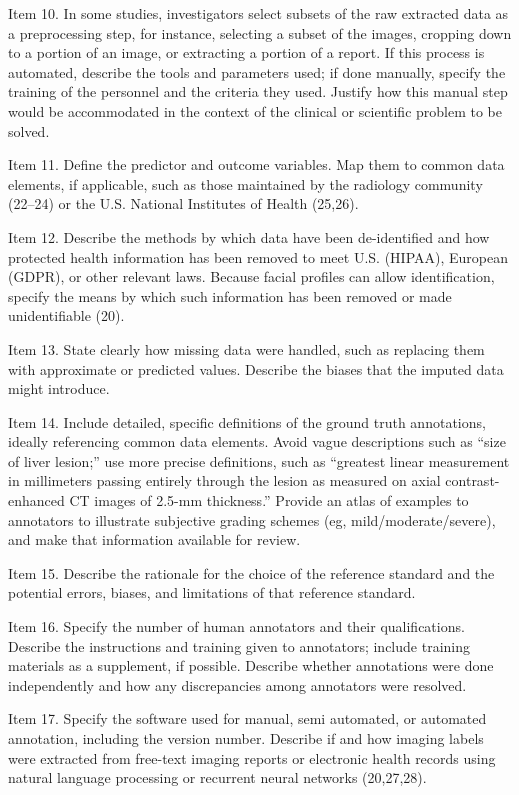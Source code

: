 Item 10. In some studies, investigators select subsets of the raw extracted data as a preprocessing step, for instance, selecting a subset of the images, cropping down to a portion of an image, or extracting a portion of a report. If this process is automated, describe the tools and parameters used; if done manually, specify the training of the personnel and the criteria they used. Justify how this manual step would be accommodated in the context of the clinical or scientific problem to be solved.

Item 11. Define the predictor and outcome variables. Map them to common data elements, if applicable, such as those maintained by the radiology community (22–24) or the U.S. National Institutes of Health (25,26).

Item 12. Describe the methods by which data have been de-identified and how protected health information has been removed to meet U.S. (HIPAA), European (GDPR), or other relevant laws. Because facial profiles can allow identification, specify the means by which such information has been removed or made unidentifiable (20).

Item 13. State clearly how missing data were handled, such as replacing them with approximate or predicted values. Describe the biases that the imputed data might introduce.

Item 14. Include detailed, specific definitions of the ground truth annotations, ideally referencing common data elements. Avoid vague descriptions such as “size of liver lesion;” use more precise definitions, such as “greatest linear measurement in millimeters passing entirely through the lesion as measured on axial contrast-enhanced CT images of 2.5-mm thickness.” Provide an atlas of examples to annotators to illustrate subjective grading schemes (eg, mild/moderate/severe), and make that information available for review.

Item 15. Describe the rationale for the choice of the reference standard and the potential errors, biases, and limitations of that reference standard.

Item 16. Specify the number of human annotators and their qualifications. Describe the instructions and training given to annotators; include training materials as a supplement, if possible. Describe whether annotations were done independently and how any discrepancies among annotators were resolved.

Item 17. Specify the software used for manual, semi automated, or automated annotation, including the version number. Describe if and how imaging labels were extracted from free-text imaging reports or electronic health records using natural language processing or recurrent neural networks (20,27,28).

